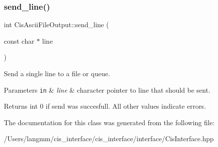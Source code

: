 \subsubsection{\texorpdfstring{send\+\_\+line()}{send\_line()}}
{\footnotesize\ttfamily int Cis\+Ascii\+File\+Output\+::send\+\_\+line (\begin{DoxyParamCaption}\item[{const char $\ast$}]{line }\end{DoxyParamCaption})\hspace{0.3cm}{\ttfamily [inline]}}



Send a single line to a file or queue. 


\begin{DoxyParams}[1]{Parameters}
\mbox{\tt in}  & {\em line} & character pointer to line that should be sent. \\
\hline
\end{DoxyParams}
\begin{DoxyReturn}{Returns}
int 0 if send was succesfull. All other values indicate errors. 
\end{DoxyReturn}


The documentation for this class was generated from the following file\+:\begin{DoxyCompactItemize}
\item 
/\+Users/langmm/cis\+\_\+interface/cis\+\_\+interface/interface/Cis\+Interface.\+hpp\end{DoxyCompactItemize}

